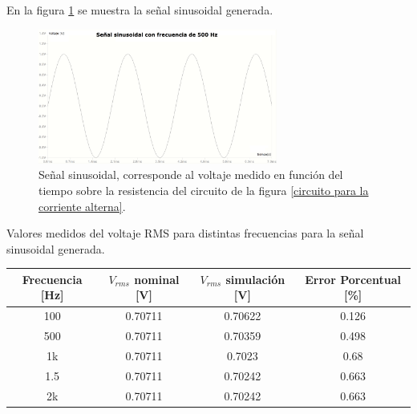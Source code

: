 \documentclass[letterpaper,11pt]{article} %
\begin{document}
En la figura \ref{señal sinuosidakl experiencia 1} se muestra la señal sinusoidal generada.
\begin{figure}
    \centering    
    \includegraphics[width=0.7\textwidth]{experiencia 1 voltaje señal sinusoidal 500 Hz.png}
    \caption{Señal sinusoidal, corresponde al voltaje medido en función del tiempo sobre la resistencia del circuito de la figura \ref{circuito para la corriente alterna}. }
    \label{señal sinuosidakl experiencia 1}
\end{figure}
\begin{center}
Valores medidos del voltaje RMS para distintas frecuencias para la señal sinusoidal generada.
\begin{tabular}{|c|c|c|c|}
\hline
\textbf{Frecuencia [Hz]} & \textbf{$V_{rms}$ nominal [V]} & \textbf{$V_{rms}$ simulación [V]} & \textbf{Error Porcentual [\%]} \\ \hline
            100       &                0.70711            &                0.70622        &               0.126            \\ \hline
            500        &                     0.70711       &               0.70359                 &      0.498                     \\ \hline
               1k     &                  0.70711          &       0.7023                        &          0.68                 \\ \hline
                 1.5   &                  0.70711          &        0.70242                       &         0.663                  \\ \hline
               2k     &                  0.70711          &          0.70242                     &             0.663                       \\ \hline                 
\end{tabular}
\end{center}
\end{document}

